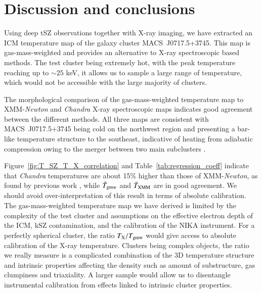 \documentclass[twocolumn,traditabstract]{aa}
\begin{document}
\section{Discussion and conclusions}\label{sec:conclusions}
Using deep tSZ observations together with X-ray imaging, we have extracted an ICM temperature map of the galaxy cluster \mbox{MACS~J0717.5+3745}. This map is gas-mass-weighted and provides an alternative to X-ray spectroscopic based methods. The test cluster being extremely hot, with the peak temperature reaching up to $\sim 25$ keV, it allows us to sample a large range of temperature, which would not be accessible with the large majority of clusters.

The morphological comparison of the gas-mass-weighted temperature map to XMM-\textit{Newton} and \textit{Chandra} X-ray spectroscopic maps indicates good agreement between the different methods. All three maps are consistent with \mbox{MACS~J0717.5+3745} being cold on the northwest region and presenting a bar-like temperature structure to the southeast, indicative of heating from adiabatic compression owing to the merger between two main subclusters \citep[see, e.g.,][]{Ma2009}.

Figure~\ref{fig:T_SZ_T_X_correlation} and Table~\ref{tab:regression_coeff} indicate that \textit{Chandra} temperatures are about 15\% higher than those of XMM-\textit{Newton}, as found by previous work \citep{Mahdavi2013,sch15}, while $\bar{T}_{\rm gmw}$ and $\bar{T}_{\rm XMM}$ are in good agreement. We should avoid over-interpretation of this result in terms of absolute calibration. The gas-mass-weighted temperature map we have derived is limited by the complexity of the test cluster and  assumptions on the effective electron depth of the ICM, kSZ contamination, and the calibration of the NIKA instrument. For a perfectly spherical cluster, the ratio $T_{\rm X} / T_{\rm gmw}$ would give access to absolute calibration of the X-ray temperature. Clusters being complex objects, the ratio we really measure is a complicated combination of the 3D temperature structure and intrinsic properties affecting the density such as amount of substructure, gas clumpiness and triaxiality. A larger sample would allow us to disentangle instrumental calibration from effects linked to intrinsic cluster properties.
\end{document}
